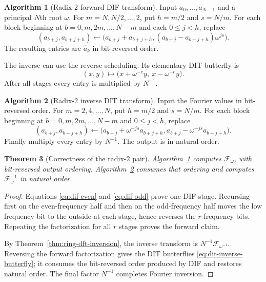 \documentclass[11pt]{book}
\newtheorem{theorem}{Theorem}[section]
\theoremstyle{definition}
\newtheorem{algorithm}[theorem]{Algorithm}
\begin{document}
\begin{algorithm}[Radix-$2$ forward DIF transform]\label{alg:fft-dif}
Input $a_0,\ldots,a_{N-1}$ and a principal $N$th root $\omega$.
For $m=N,N/2,\ldots,2$, put $h=m/2$ and $s=N/m$.  For each block beginning
at $b=0,m,2m,\ldots,N-m$ and each $0\leq j<h$, replace
\[
 (a_{b+j},a_{b+j+h})
 \longleftarrow
 \bigl(a_{b+j}+a_{b+j+h},
       (a_{b+j}-a_{b+j+h})\omega^{js}\bigr).
\]
The resulting entries are $\widehat a_k$ in bit-reversed order.
\end{algorithm}

The inverse can use the reverse scheduling.  Its elementary DIT butterfly is
\begin{equation}\label{eq:dit-inverse-butterfly}
 (x,y)\longmapsto
 \bigl(x+\omega^{-e}y,\ x-\omega^{-e}y\bigr).
\end{equation}
After all stages every entry is multiplied by $N^{-1}$.

\begin{algorithm}[Radix-$2$ inverse DIT transform]\label{alg:fft-dit-inverse}
Input the Fourier values in bit-reversed order.  For
$m=2,4,\ldots,N$, put $h=m/2$ and $s=N/m$.  For each block beginning at
$b=0,m,2m,\ldots,N-m$ and $0\leq j<h$, replace
\[
 (a_{b+j},a_{b+j+h})
 \longleftarrow
 \bigl(a_{b+j}+\omega^{-js}a_{b+j+h},
       a_{b+j}-\omega^{-js}a_{b+j+h}\bigr).
\]
Finally multiply every entry by $N^{-1}$.  The output is in natural order.
\end{algorithm}

\begin{theorem}[Correctness of the radix-$2$ pair]
Algorithm~\ref{alg:fft-dif} computes $\mathcal F_\omega$, with bit-reversed
output ordering.  Algorithm~\ref{alg:fft-dit-inverse} consumes that ordering
and computes $\mathcal F_\omega^{-1}$ in natural order.
\end{theorem}

\begin{proof}
Equations \eqref{eq:dif-even} and \eqref{eq:dif-odd} prove one DIF stage.
Recursing first on the even-frequency half and then on the odd-frequency half
moves the low frequency bit to the outside at each stage, hence reverses the
$r$ frequency bits.  Repeating the factorization for all $r$ stages proves the
forward claim.

By Theorem~\ref{thm:ring-dft-inversion}, the inverse transform is
$N^{-1}\mathcal F_{\omega^{-1}}$.  Reversing the forward factorization gives
the DIT butterflies \eqref{eq:dit-inverse-butterfly}; it consumes the
bit-reversed order produced by DIF and restores natural order.  The final
factor $N^{-1}$ completes Fourier inversion.
\end{proof}
\end{document}
